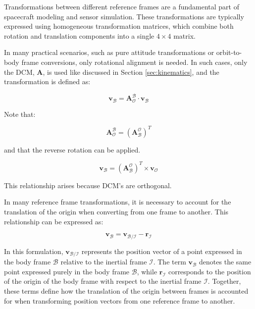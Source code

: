 Transformations between different reference frames are a fundamental part of spacecraft modeling and sensor simulation. These 
transformations are typically expressed using homogeneous transformation matrices, which combine both rotation and translation components 
into a single $4 \times 4$ matrix.


In many practical scenarios, such as pure attitude transformations or orbit-to-body frame conversions, only rotational 
alignment is needed. In such cases, only the DCM, $\mathbf{A}$, is used like discussed in Section \ref{sec:kinematics}, and the transformation is defined as:

\begin{equation}
    \mathbf{v}_\mathcal{B} = \mathbf{A}_\mathcal{O}^\mathcal{B} \cdot \mathbf{v}_\mathcal{B}
\end{equation}

\noindent Note that:

\begin{equation}
    \mathbf{A}_\mathcal{O}^\mathcal{B} = \left( \mathbf{A}_\mathcal{B}^\mathcal{O} \right)^T
\end{equation}

\noindent and that the reverse rotation can be applied.

\begin{equation}
    \mathbf{v}_\mathcal{B} = \left(\mathbf{A}_\mathcal{B}^\mathcal{O}\right)^T \times \mathbf{v}_\mathcal{O}
\end{equation}

\noindent This relationship arises because DCM's are orthogonal.


In many reference frame transformations, it is necessary to account for the translation of the origin when converting from one frame to another. This relationship 
can be expressed as:

\begin{equation}
    \mathbf{v}_\mathcal{B} = \mathbf{v}_{\mathcal{B}/\mathcal{I}} - \mathbf{r}_\mathcal{I}
\end{equation}

\noindent In this formulation, $\mathbf{v}_{\mathcal{B}/\mathcal{I}}$ represents the position vector of a point expressed 
in the body frame $\mathcal{B}$ relative to the inertial frame $\mathcal{I}$. The term $\mathbf{v}_\mathcal{B}$ denotes the same point expressed 
purely in the body frame $\mathcal{B}$, while $\mathbf{r}_\mathcal{I}$ corresponds to the position of the origin of the body frame with respect to the 
inertial frame $\mathcal{I}$. Together, these terms define how the translation of the origin between frames is accounted for when transforming position vectors 
from one reference frame to another.
\vspace{0.5cm}

